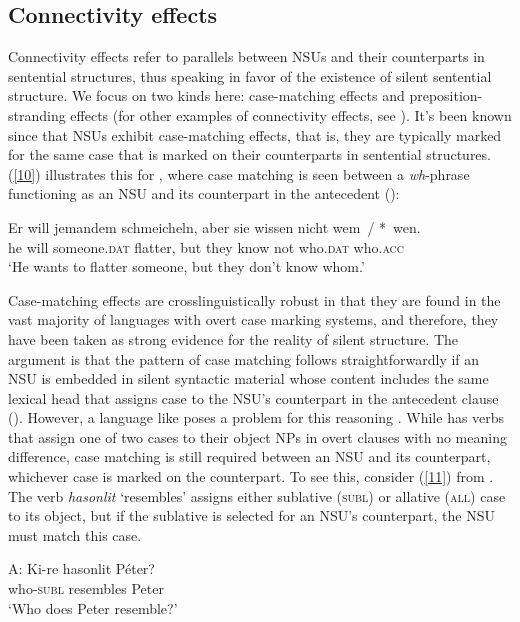 \subsection{Connectivity effects}
\label{sec-connectivity-effects}

Connectivity effects refer to parallels between NSUs and their counterparts in sentential structures, thus speaking in favor of the existence of silent sentential structure. We focus on two kinds here: case-matching effects and preposition-stranding effects (for other examples of connectivity effects, see \citealt{Ginzburg2018}). It's been known since \citet{Ross1967} that NSUs exhibit case-matching effects, that is, they are typically marked for the same case that is marked on their counterparts in sentential structures. (\ref{10}) illustrates this for , where case matching is seen between a \emph{wh}-phrase functioning as an NSU and its counterpart in the antecedent (\citealt[663]{Merchant2005-proc}):

\ea
\gll Er will jemandem schmeicheln, aber sie wissen nicht wem~/ *~wen.\\
     he will someone.\textsc{dat} flatter, but they know not who.\textsc{dat}  \hphantom{*~}who.\textsc{acc}\\
\glt `He wants to flatter someone, but they don't know whom.'\label{10}\z


Case-matching effects are crosslinguistically robust in that they are found in the vast majority of languages with overt case marking systems, and therefore, they have been taken as strong evidence for the reality of silent structure. The argument is that the pattern of case matching follows straightforwardly if an NSU is embedded in silent syntactic material whose content includes the same lexical head that assigns case to the NSU's counterpart in the antecedent clause (\citealt{Merchant2001, Merchant2005a}). However, a language like  poses a problem for this reasoning \citep{Jacobson2016}. While  has verbs that assign one of two cases to their object NPs in overt clauses with no meaning difference, case matching is still required between an NSU and its counterpart, whichever case is marked on the counterpart. To see this, consider (\ref{11}) from \citet[356]{Jacobson2016}. The verb \emph{hasonlit} `resembles' assigns either sublative (\textsc{subl}) or allative (\textsc{all}) case to its object, but if  the sublative is selected for an NSU's counterpart, the NSU  must match this case.

\ea
A: \gll Ki-re hasonlit P\'{e}ter?\\
        who-\textsc{subl} resembles Peter\\
   \glt  `Who does Peter resemble?'\\

